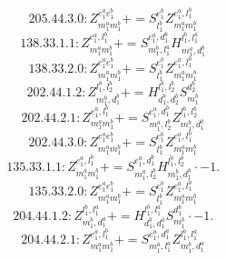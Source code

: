 \documentclass[letterpaper,10pt,fleqn,leqno,onecolumn]{article}
\begin{document}
\begin{equation} \;\;\;\;\;\;  205.44.3.0: Z^{e_{1}^{a}e_{1}^{b}}_{m_{1}^{a}m_{1}^{b}}+=S^{e_{1}^{b}}_{l_{1}^{b}}Z^{e_{1}^{a},l_{1}^{b}}_{m_{1}^{a}m_{1}^{b}} \end{equation}
\begin{equation} \;\;\;\;\;\;  138.33.1.1: Z^{e_{1}^{a},l_{1}^{b}}_{m_{1}^{a}m_{1}^{b}}+=S^{e_{1}^{a},d_{1}^{b}}_{m_{1}^{b},l_{1}^{a}}H^{l_{1}^{b},l_{1}^{a}}_{m_{1}^{a},d_{1}^{b}} \end{equation}
\begin{equation} \;\;\;\;\;\;  138.33.2.0: Z^{e_{1}^{a}e_{1}^{b}}_{m_{1}^{a}m_{1}^{b}}+=S^{e_{1}^{b}}_{l_{1}^{b}}Z^{e_{1}^{a},l_{1}^{b}}_{m_{1}^{a}m_{1}^{b}} \end{equation}
\begin{equation} \;\;\;\;\;\;  202.44.1.2: Z^{l_{1}^{b},l_{2}^{b}}_{m_{1}^{b},d_{1}^{b}}+=H^{l_{1}^{b},l_{2}^{b}}_{d_{1}^{b},d_{2}^{b}}S^{d_{2}^{b}}_{m_{1}^{b}} \end{equation}
\begin{equation} \;\;\;\;\;\;  202.44.2.1: Z^{e_{1}^{a},l_{1}^{b}}_{m_{1}^{a}m_{1}^{b}}+=S^{e_{1}^{a},d_{1}^{b}}_{m_{1}^{a},l_{2}^{b}}Z^{l_{1}^{b},l_{2}^{b}}_{m_{1}^{b},d_{1}^{b}} \end{equation}
\begin{equation} \;\;\;\;\;\;  202.44.3.0: Z^{e_{1}^{a}e_{1}^{b}}_{m_{1}^{a}m_{1}^{b}}+=S^{e_{1}^{b}}_{l_{1}^{b}}Z^{e_{1}^{a},l_{1}^{b}}_{m_{1}^{a}m_{1}^{b}} \end{equation}
\begin{equation} \;\;\;\;\;\;  135.33.1.1: Z^{e_{1}^{a},l_{1}^{b}}_{m_{1}^{a}m_{1}^{b}}+=S^{e_{1}^{a},d_{1}^{b}}_{m_{1}^{a},l_{2}^{b}}H^{l_{1}^{b},l_{2}^{b}}_{m_{1}^{b},d_{1}^{b}}\cdot -1. \end{equation}
\begin{equation} \;\;\;\;\;\;  135.33.2.0: Z^{e_{1}^{a}e_{1}^{b}}_{m_{1}^{a}m_{1}^{b}}+=S^{e_{1}^{b}}_{l_{1}^{b}}Z^{e_{1}^{a},l_{1}^{b}}_{m_{1}^{a}m_{1}^{b}} \end{equation}
\begin{equation} \;\;\;\;\;\;  204.44.1.2: Z^{l_{1}^{b},l_{1}^{a}}_{m_{1}^{b},d_{1}^{a}}+=H^{l_{1}^{b},l_{1}^{a}}_{d_{1}^{b},d_{1}^{a}}S^{d_{1}^{b}}_{m_{1}^{b}}\cdot -1. \end{equation}
\begin{equation} \;\;\;\;\;\;  204.44.2.1: Z^{e_{1}^{a},l_{1}^{b}}_{m_{1}^{a}m_{1}^{b}}+=S^{e_{1}^{a},d_{1}^{a}}_{m_{1}^{a},l_{1}^{a}}Z^{l_{1}^{b},l_{1}^{a}}_{m_{1}^{b},d_{1}^{a}} \end{equation}
\end{document}
